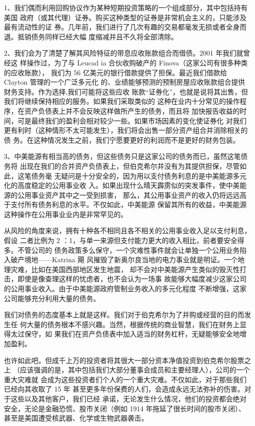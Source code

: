 \documentclass[UTF8,a4paper,zihao=-4,fontset = windows]{ctexart} %
\begin{document}
1、我们偶而利用回购协议作为某种短期投资策略的一个组成部分，其中包括持有美国
政府（或其代理）证券。购买这种类型的证券是非常机会主义的，只能涉及最有流动性的证
券。几年前，我们进行了几次有趣的交易都毫发无损或者全身而退。抵销债务同样已经大幅
度缩减并且不久将全部清除。

2、我们会为了清楚了解其风险特征的带息应收账款组合而借债。2001 年我们就曾经这
样操作过，为了与 Leucad ia 合伙收购破产的 Finova（这家公司有很多种类的应收账款），
我们为 56 亿美元的银行借款提供了担保。最近我们借款给 Clayton 管理的一个广泛多元化
的、业绩能够预测的预制房屋应收账款组合提供财务支持。作为选择,我们可能将这些应收
账款“证券化”，也就是说将其出售，但我们将继续保持相应的服务。如果我们采取类似的
这种在业内十分常见的操作程序，在资产负债表上并不会反映这样做所产生的债务，而且将
加快报告收益的时间，可是最终我们的盈利会相对较少一些。如果市场因素的变化使证券化
对我们更有利时（这种情形不太可能发生），我们将会出售一部分资产组合并消除相关的债
务。在这种情况发生之前，我们宁愿要更好的利润而不是更好的财务包装。

3、中美能源有相当高的债务，但这些债务只是这家公司的债务而已，虽然这笔债务将
出现在我们的合并资产负债表上，但伯克希尔并没有为其提供担保，尽管如此，这笔债务毫
无疑问是十分安全的，因为用以支付债务利息的是中美能源多元化的高度稳定的公用事业收
入。如果出现什么晴天霹雳似的突发事件，使中美能源的公用事业资产其中之一受到损害，
那么，其公用事业资产的收入仍将远远高于支付所有债务利息的水平。不仅如此，中美能源
保留其所有的收益，中美能源这种操作在公用事业业内是非常罕见的。

从风险的角度来说，拥有十种各不相同且各不相关的公用事业收入足以支付利息，假设
二者比例为 2 ：1，与单一来源但支付能力更大的收入相比，前者要安全得多。不管公司的
债务政策多么保守，一个灾难性事件就会让单独一个公用业务陷入破产境地——Katrina 飓
风摧毁了新奥尔良当地的电力事业就是明证。一个地理灾难，比如在美国西部地区发生地震，
却不会对中美能源产生类似的毁灭性打击，即使是像查理这样的忧虑者，也不会认为一场事
故能够大幅度减少这家公司的公用事业收入。由于中美能源政府管制业务收入的多元化程度
不断增强，这家公司能够充分利用大量的债务。

我们对债务的态度基本上就是这样。我们对于伯克希尔为了并购或经营的目的而发生任
何大量的债务根本不感兴趣。当然，根据传统的商业智慧，我们在财务上显得太过保守，如
果我们在资产负债表中加入适当的财务杠杆，无疑能够安全地增加盈利。

也许如此吧。但成千上万的投资者将其很大一部分资本净值投资到伯克希尔股票之上
（应该强调的是，其中包括我们大部分董事会成员和主要经理人），公司的一个重大灾难就
会成为这些投资者们个人的一个重大灾难。不仅如此，对于那些我们已经向其收取了 15 年
甚至更多年份保费的人们，会造成永远无法弥补的伤害。对于这些以及其他客户，我们已经
承诺，无论发生什么情况，他们的投资都会绝对安全，无论是金融恐慌、股市关闭（例如
1914 年拖延了很长时间的股市关闭）、甚至是美国遭受核武器、化学或生物武器袭击。
\end{document}
